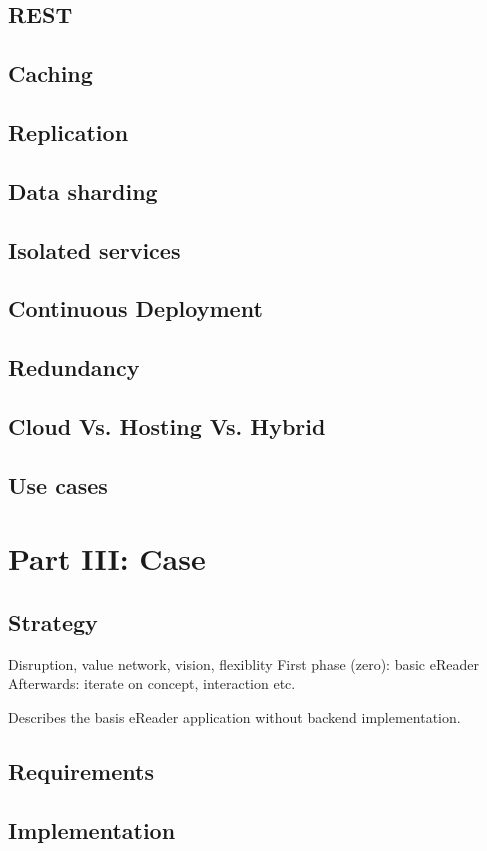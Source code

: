 \documentclass[a4paper,10pt]{article}
\begin{document}
\subsection{REST}
\subsection{Caching}
\subsection{Replication}
\subsection{Data sharding}
\subsection{Isolated services}
\subsection{Continuous Deployment}
\subsection{Redundancy}
\subsection{Cloud Vs. Hosting Vs. Hybrid}
\subsection{Use cases}


\section{Part III: Case}
\subsection{Strategy}
Disruption, value network, vision, flexiblity
First phase (zero): basic eReader
Afterwards: iterate on concept, interaction etc.

Describes the basis eReader application without backend implementation.
\subsection{Requirements}
\subsection{Implementation}
\end{document}
